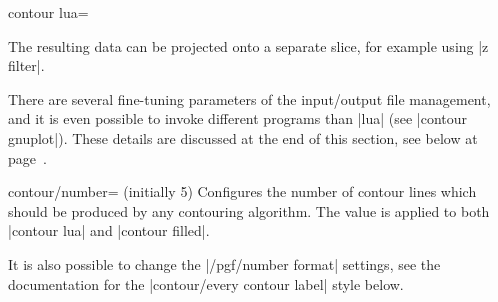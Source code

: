 {{\begin{plottype}[/pgfplots]{
    contour lua=\textcolor{black}{}%
}
\begin{codeexample}[]
\end{codeexample}

    The resulting data can be projected onto a separate slice, for example
    using |z filter|.
\pgfplotsexpensiveexample
\begin{codeexample}[]
\end{codeexample}

    There are several fine-tuning parameters of the input/output file
    management, and it is even possible to invoke different programs than
    |lua| (see |contour gnuplot|). These details are discussed at the end of this
    section, see below at page~\pageref{key:pgfplots:contour:gnuplot}.
\end{plottype}

\begin{pgfplotskey}{contour/number= (initially 5)}
    Configures the number of contour lines which should be produced by any
    contouring algorithm. The value is applied to both |contour lua| and
    |contour filled|.
\pgfplotsexpensiveexample
\begin{codeexample}[]
\end{codeexample}
    It is also possible to change the |/pgf/number format| settings, see the
    documentation for the |contour/every contour label| style below.


\end{pgfplotskey}}}
